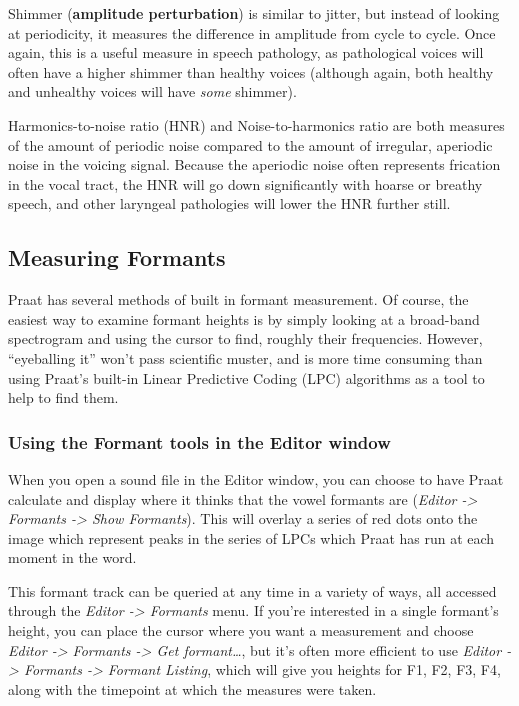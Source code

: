 \documentclass[11pt]{article}
\begin{document}
Shimmer (\textbf{amplitude perturbation}) is similar to jitter, but
instead of looking at periodicity, it measures the difference in
amplitude from cycle to cycle. Once again, this is a useful measure in
speech pathology, as pathological voices will often have a higher
shimmer than healthy voices (although again, both healthy and unhealthy
voices will have \emph{some} shimmer).

Harmonics-to-noise ratio (HNR) and Noise-to-harmonics ratio are both
measures of the amount of periodic noise compared to the amount of
irregular, aperiodic noise in the voicing signal. Because the aperiodic
noise often represents frication in the vocal tract, the HNR will go
down significantly with hoarse or breathy speech, and other laryngeal
pathologies will lower the HNR further still.

\hypertarget{measuring-formants}{%
\subsection{Measuring Formants}\label{measuring-formants}}

\label{sub:measuringformants}

Praat has several methods of built in formant measurement. Of course,
the easiest way to examine formant heights is by simply looking at a
broad-band spectrogram and using the cursor to find, roughly their
frequencies. However, ``eyeballing it'' won't pass scientific muster,
and is more time consuming than using Praat's built-in Linear Predictive
Coding (LPC) algorithms as a tool to help to find them.

\hypertarget{using-the-formant-tools-in-the-editor-window}{%
\subsubsection{Using the Formant tools in the Editor
window}\label{using-the-formant-tools-in-the-editor-window}}

When you open a sound file in the Editor window, you can choose to have
Praat calculate and display where it thinks that the vowel formants are
(\emph{Editor -\textgreater{} Formants -\textgreater{} Show Formants}).
This will overlay a series of red dots onto the image which represent
peaks in the series of LPCs which Praat has run at each moment in the
word.

This formant track can be queried at any time in a variety of ways, all
accessed through the \emph{Editor -\textgreater{} Formants} menu. If
you're interested in a single formant's height, you can place the cursor
where you want a measurement and choose \emph{Editor -\textgreater{}
Formants -\textgreater{} Get formant\ldots{}}, but it's often more
efficient to use \emph{Editor -\textgreater{} Formants -\textgreater{}
Formant Listing}, which will give you heights for F1, F2, F3, F4, along
with the timepoint at which the measures were taken.
\end{document}
